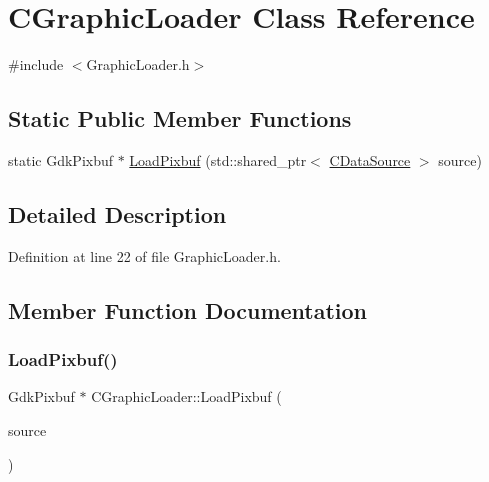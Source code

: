 \hypertarget{classCGraphicLoader}{}\section{C\+Graphic\+Loader Class Reference}
\label{classCGraphicLoader}


{\ttfamily \#include $<$Graphic\+Loader.\+h$>$}

\subsection*{Static Public Member Functions}
\begin{DoxyCompactItemize}
\item 
static Gdk\+Pixbuf $\ast$ \hyperlink{classCGraphicLoader_ac7778dec4fd0ea51674f0b23f3029edf}{Load\+Pixbuf} (std\+::shared\+\_\+ptr$<$ \hyperlink{classCDataSource}{C\+Data\+Source} $>$ source)
\end{DoxyCompactItemize}


\subsection{Detailed Description}


Definition at line 22 of file Graphic\+Loader.\+h.



\subsection{Member Function Documentation}
\hypertarget{classCGraphicLoader_ac7778dec4fd0ea51674f0b23f3029edf}{}\label{classCGraphicLoader_ac7778dec4fd0ea51674f0b23f3029edf} 
\subsubsection{\texorpdfstring{Load\+Pixbuf()}{LoadPixbuf()}}
{\footnotesize\ttfamily Gdk\+Pixbuf $\ast$ C\+Graphic\+Loader\+::\+Load\+Pixbuf (\begin{DoxyParamCaption}\item[{std\+::shared\+\_\+ptr$<$ \hyperlink{classCDataSource}{C\+Data\+Source} $>$}]{source }\end{DoxyParamCaption})\hspace{0.3cm}{\ttfamily [static]}}




